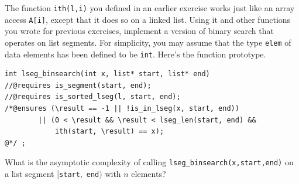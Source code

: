 \begin{flex}
\begin{exercise}
\label{ex:linked-list-binsearch}
  The function \lstinline'ith(l,i)' you defined in an earlier exercise
  works just like an array access \lstinline'A[i]', except that it
  does so on a linked list.  Using it and other functions you wrote
  for previous exercises, implement a version of binary search that
  operates on list segments.  For simplicity, you may assume that the
  type \lstinline'elem' of data elements has been defined to be
  \lstinline'int'.  Here's the function prototype.
\begin{lstlisting}[language={[C0]C}]
int lseg_binsearch(int x, list* start, list* end)
//@requires is_segment(start, end);
//@requires is_sorted_lseg(l, start, end);
/*@ensures (\result == -1 || !is_in_lseg(x, start, end))
        || (0 < \result && \result < lseg_len(start, end) &&
            ith(start, \result) == x);
@*/ ;
\end{lstlisting}

What is the asymptotic complexity of calling
\lstinline'lseg_binsearch(x,start,end)' on a list segment
$[$\lstinline'start'$,$ \lstinline'end'$)$ with $n$ elements?
\end{exercise}


\begin{solution}
\label{ex:linked-list-binsearch-solved}


\end{solution}
\end{flex}

